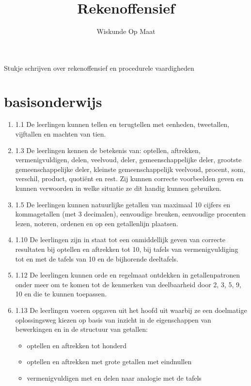 \documentclass{article}
\begin{document}
\author{Wiskunde Op Maat}
\title{Rekenoffensief}

\maketitle

Stukje schrijven over rekenoffensief en procedurele vaardigheden 


\section{basisonderwijs} 

\begin{enumerate}

    
    \item 1.1    De leerlingen kunnen tellen en terugtellen met eenheden, tweetallen, vijftallen en machten van tien.
    
    \item 1.3    De leerlingen kennen de betekenis van: optellen, aftrekken, vermenigvuldigen, delen, veelvoud, deler, gemeenschappelijke deler, grootste gemeenschappelijke deler, kleinste gemeenschappelijk veelvoud, procent, som, verschil, product, quotiënt en rest. Zij kunnen correcte voorbeelden geven en kunnen verwoorden in welke situatie ze dit handig kunnen gebruiken.
    
    \item 1.5    De leerlingen kunnen natuurlijke getallen van maximaal 10 cijfers en kommagetallen (met 3 decimalen), eenvoudige breuken, eenvoudige procenten lezen, noteren, ordenen en op een getallenlijn plaatsen.
    
    
    \item 1.10   De leerlingen zijn in staat tot een onmiddellijk geven van correcte resultaten bij optellen en aftrekken tot 10, bij tafels van vermenigvuldiging tot en met de tafels van 10 en de bijhorende deeltafels.
    
    \item 1.12   De leerlingen kunnen orde en regelmaat ontdekken in getallenpatronen onder meer om te komen tot de kenmerken van deelbaarheid door 2, 3, 5, 9, 10 en die te kunnen toepassen.
    
    \item 1.13   De leerlingen voeren opgaven uit het hoofd uit waarbij ze een doelmatige oplossingsweg kiezen op basis van inzicht in de eigenschappen van bewerkingen en in de structuur van getallen:
    \begin{itemize}
        \item optellen en aftrekken tot honderd
        \item optellen en aftrekken met grote getallen met eindnullen
        \item vermenigvuldigen met en delen naar analogie met de tafels
    \end{itemize}
        

\end{enumerate}
\end{document}
